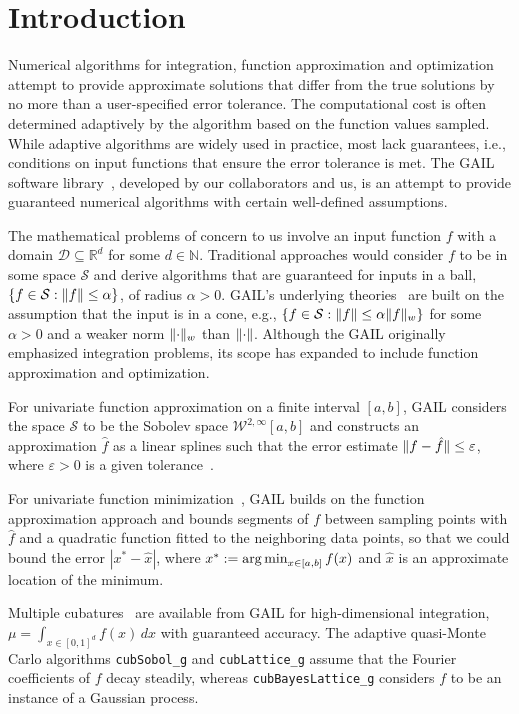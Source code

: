 \section{Introduction} \label{sec:intro}

Numerical algorithms for integration, function approximation and
optimization attempt to provide approximate solutions that differ from the
true solutions by no more than a user-specified error tolerance. The
computational cost is often determined adaptively by the algorithm based on
the function values sampled. While adaptive algorithms are widely used in
practice, most lack guarantees, i.e., conditions on input functions that
ensure the error tolerance is met. The GAIL software library~\cite{ChoEtal18b},
developed by our collaborators and us, is an attempt to provide guaranteed
numerical algorithms with certain well-defined assumptions.

The mathematical problems of concern to us involve an input function $f$
with a domain $\mathcal{D} \subseteq \mathbb{R}^d$ for some $d \in \mathbb{N}$.
Traditional approaches would  consider $f$ to be in some space
$\mathcal{S}$ and derive algorithms that are guaranteed for inputs in a ball, $\{f \in \mathcal{S}: \lVert f\rVert \le \alpha \}$, of radius $\alpha >0$.  GAIL's underlying
theories~\cite{clancy2014cost} are built on the assumption that the input is in a
cone, e.g., $\{f  \in \mathcal{S}:\lVert f\rVert \le \alpha \lVert f\rVert_w \}$ for
some $\alpha >0$ and a weaker norm $\lVert \cdot\rVert_w$ than $\lVert \cdot\rVert$.  Although the GAIL originally emphasized integration problems, its scope has expanded to include function approximation and optimization.

For univariate function approximation on a finite interval $[a,b]$, GAIL
considers the space $\mathcal{S}$ to be the Sobolev space
$\mathcal{W}^{2,\infty}[a,b]$ and constructs an approximation $\hat{f}$ as a linear
splines such that the error estimate $\lVert f - \hat{f}\rVert \le \varepsilon$,
where $\varepsilon>0$ is a given
tolerance~\cite{FunappxFunmin,clancy2014cost}.

For univariate function minimization~\cite{FunappxFunmin}, GAIL builds on
the function approximation approach and bounds segments of $f$  between
sampling points with $\hat{f}$ and a quadratic function fitted to the
neighboring data points, so that we could bound the  error $|x^*-\hat{x}|$,
where $x^* := \operatorname*{arg\,min}_{x \in [a,b]} f(x)$ and $\hat{x}$ is an approximate location of the 
minimum.

Multiple cubatures~\cite{cubBayesLattice,cubSobol,cubLattice,meanMCcubMC}
are available from GAIL for high-dimensional integration, $ \mu = \int_{x
\in [0,1]^d} f(x) \, dx$ with guaranteed accuracy. The adaptive quasi-Monte Carlo algorithms \texttt{cubSobol\_g}
and \texttt{cubLattice\_g} assume that the Fourier coefficients of $f$ decay steadily,
whereas \texttt{cubBayesLattice\_g} considers $f$ to be an instance of a
Gaussian process.

